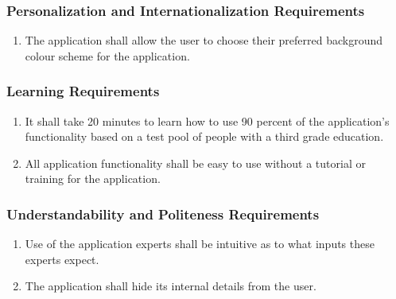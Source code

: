 \documentclass[titlepage]{article}
\newcounter{myCounter}
\begin{document}
\subsubsection{Personalization and Internationalization Requirements}
\label{ssub:personalization_and_internationalization_requirements}
\begin{enumerate}[{UH}1. ]
    \setcounter{enumi}{\themyCounter}
    \item The application shall allow the user to choose their preferred background colour scheme
    for the application.
    \setcounter{myCounter}{\theenumi}
\end{enumerate}

\subsubsection{Learning Requirements}
\label{ssub:learning_requirements}
\begin{enumerate}[{UH}1. ]
    \setcounter{enumi}{\themyCounter}
    \item It shall take 20 minutes to learn how to use 90 percent of the application's functionality
    based on a test pool of people with a third grade education.
    \item All application functionality shall be easy to use without a tutorial or training for the
    application.
    \setcounter{myCounter}{\theenumi}
\end{enumerate}

\subsubsection{Understandability and Politeness Requirements}
\label{ssub:understandability_and_politeness_requirements}
\begin{enumerate}[{UH}1. ]
    \setcounter{enumi}{\themyCounter}
    \item Use of the application experts shall be intuitive as to what inputs these experts expect.
    \item The application shall hide its internal details from the user.
    \setcounter{myCounter}{\theenumi}
\end{enumerate}
\end{document}
